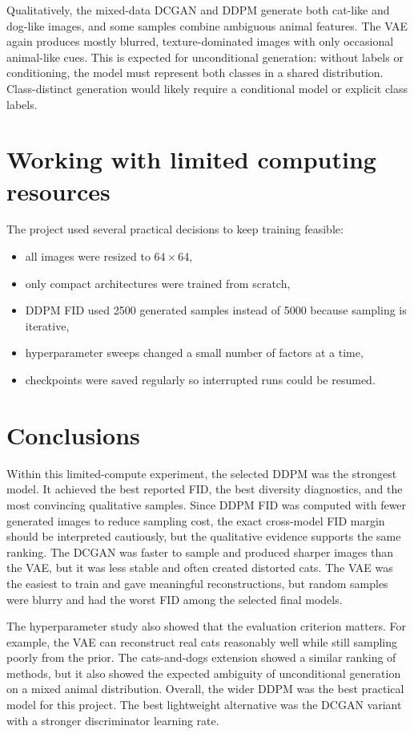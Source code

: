 \documentclass[11pt,a4paper]{article}
\begin{document}
Qualitatively, the mixed-data DCGAN and DDPM generate both cat-like and dog-like images, and some samples combine ambiguous animal features.
The VAE again produces mostly blurred, texture-dominated images with only occasional animal-like cues.
This is expected for unconditional generation: without labels or conditioning, the model must represent both classes in a shared distribution.
Class-distinct generation would likely require a conditional model or explicit class labels.

\section{Working with limited computing resources}

The project used several practical decisions to keep training feasible:
\begin{itemize}
  \item all images were resized to $64\times64$,
  \item only compact architectures were trained from scratch,
  \item DDPM FID used 2500 generated samples instead of 5000 because sampling is iterative,
  \item hyperparameter sweeps changed a small number of factors at a time,
  \item checkpoints were saved regularly so interrupted runs could be resumed.
\end{itemize}

\clearpage
\section{Conclusions}

Within this limited-compute experiment, the selected DDPM was the strongest model.
It achieved the best reported FID, the best diversity diagnostics, and the most convincing qualitative samples.
Since DDPM FID was computed with fewer generated images to reduce sampling cost, the exact cross-model FID margin should be interpreted cautiously, but the qualitative evidence supports the same ranking.
The DCGAN was faster to sample and produced sharper images than the VAE, but it was less stable and often created distorted cats.
The VAE was the easiest to train and gave meaningful reconstructions, but random samples were blurry and had the worst FID among the selected final models.

The hyperparameter study also showed that the evaluation criterion matters.
For example, the VAE can reconstruct real cats reasonably well while still sampling poorly from the prior.
The cats-and-dogs extension showed a similar ranking of methods, but it also showed the expected ambiguity of unconditional generation on a mixed animal distribution.
Overall, the wider DDPM was the best practical model for this project.
The best lightweight alternative was the DCGAN variant with a stronger discriminator learning rate.
\end{document}
